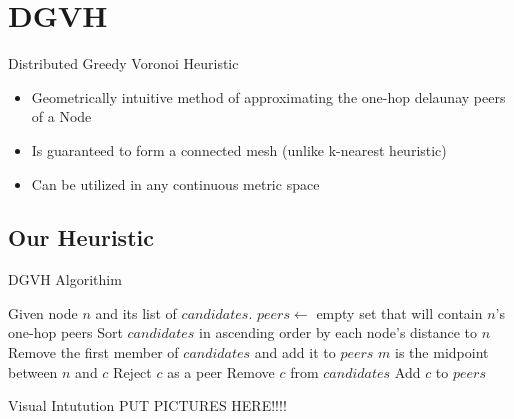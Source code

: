 \documentclass[8pt]{beamer}
\begin{document}
	

	
\section{DGVH}
	\begin{frame}{Distributed Greedy Voronoi Heuristic}
		\begin{itemize}
			\item Geometrically intuitive method of approximating the one-hop delaunay peers of a Node
			\item Is guaranteed to form a connected mesh (unlike k-nearest heuristic)
			\item Can be utilized in any continuous metric space
		\end{itemize}
		
	\end{frame}
	
	\subsection{Our Heuristic}
	
	
	\begin{frame}{DGVH Algorithim}

			\begin{algorithmic}[1]  %
				\STATE Given node $n$ and its list of $candidates$.
				\STATE $peers \leftarrow$ empty set that will contain $n$'s one-hop peers
				\STATE Sort $candidates$ in ascending order by each node's distance to $n$
				\STATE Remove the first member of $candidates$ and add it to $peers$
				\STATE $m$ is the midpoint between $n$ and $c$
				\STATE Reject $c$ as a peer
				\ELSE
				\STATE Remove $c$ from $candidates$
				\STATE Add $c$ to $peers$
				\ENDIF
				\ENDFOR
			\end{algorithmic}

	\end{frame}
	
	
	
\begin{frame}{Visual Intutution}
	PUT PICTURES HERE!!!!
\end{frame}
	
	
	
	
\end{document}
